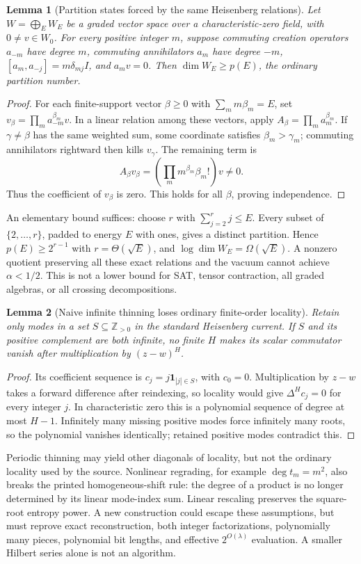 \documentclass[11pt,letterpaper]{article}
\newtheorem{lemma}{Lemma}
\begin{document}
\begin{lemma}[Partition states forced by the same Heisenberg relations]
Let $W=\bigoplus_E W_E$ be a graded vector space over a characteristic-zero field, with
$0\ne v\in W_0$. For every positive integer $m$, suppose commuting creation operators
$a_{-m}$ have degree $m$, commuting annihilators $a_m$ have degree $-m$,
$[a_m,a_{-j}]=m\delta_{mj}I$, and $a_mv=0$. Then $\dim W_E\ge p(E)$,
the ordinary partition number.
\end{lemma}
\begin{proof}
For each finite-support vector $\beta\ge0$ with $\sum_m m\beta_m=E$, set
$v_\beta=\prod_m a_{-m}^{\beta_m}v$. In a linear relation among these vectors,
apply $A_\beta=\prod_m a_m^{\beta_m}$. If $\gamma\ne\beta$ has the same weighted
sum, some coordinate satisfies $\beta_m>\gamma_m$; commuting annihilators rightward
then kills $v_\gamma$. The remaining term is
\[
 A_\beta v_\beta=\left(\prod_m m^{\beta_m}\beta_m!\right)v\ne0.
\]
Thus the coefficient of $v_\beta$ is zero. This holds for all $\beta$, proving independence.
\end{proof}
An elementary bound suffices: choose $r$ with $\sum_{j=2}^r j\le E$. Every subset of $\{2,\ldots,r\}$, padded to energy $E$ with ones, gives a distinct partition. Hence $p(E)\ge2^{r-1}$ with $r=\Theta(\sqrt E)$, and $\log\dim W_E=\Omega(\sqrt E)$.
A nonzero quotient preserving all these exact relations and the vacuum cannot achieve
$\alpha<1/2$. This is not a lower bound for SAT, tensor contraction, all graded algebras,
or all crossing decompositions.

\begin{lemma}[Naive infinite thinning loses ordinary finite-order locality]
Retain only modes in a set $S\subseteq\mathbb Z_{>0}$ in the standard Heisenberg current.
If $S$ and its positive complement are both infinite, no finite $H$ makes its scalar
commutator vanish after multiplication by $(z-w)^H$.
\end{lemma}
\begin{proof}
Its coefficient sequence is $c_j=j\mathbf1_{|j|\in S}$, with $c_0=0$.
Multiplication by $z-w$ takes a forward difference after reindexing, so locality would give
$\Delta^Hc_j=0$ for every integer $j$. In characteristic zero this is a polynomial sequence
of degree at most $H-1$. Infinitely many missing positive modes force infinitely many roots,
so the polynomial vanishes identically; retained positive modes contradict this.
\end{proof}
Periodic thinning may yield other diagonals of locality, but not the ordinary locality
used by the source. Nonlinear regrading, for example $\deg t_m=m^2$, also breaks the
printed homogeneous-shift rule: the degree of a product is no longer determined by
its linear mode-index sum. Linear rescaling preserves the square-root entropy power.
A new construction could escape these assumptions, but must reprove exact reconstruction,
both integer factorizations, polynomially many pieces, polynomial bit lengths, and effective
$2^{O(\lambda)}$ evaluation. A smaller Hilbert series alone is not an algorithm.
\end{document}
